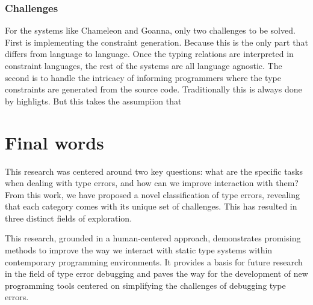 \subsubsection{Challenges}

For the systems like Chameleon and Goanna, only two challenges to be solved. First is implementing the constraint generation. Because this is the only part that differs from language to language. Once the typing relations are interpreted in constraint languages, the rest of the systems are all language agnostic.  The second is to handle the intricacy of informing programmers where the type constraints are generated from the source code. Traditionally this is always done by highligts. But this takes the assumpiion that 


\section{Final words}

This research was centered around two key questions: what are the specific tasks when dealing with type errors, and how can we improve interaction with them? From this work, we have proposed a novel classification of type errors, revealing that each category comes with its unique set of challenges. This has resulted in three distinct fields of exploration. 

This research, grounded in a human-centered approach, demonstrates promising methods to improve the way we interact with static type systems within contemporary programming environments. It provides a basis for future research in the field of type error debugging and paves the way for the development of new programming tools centered on simplifying the challenges of debugging type errors. 
